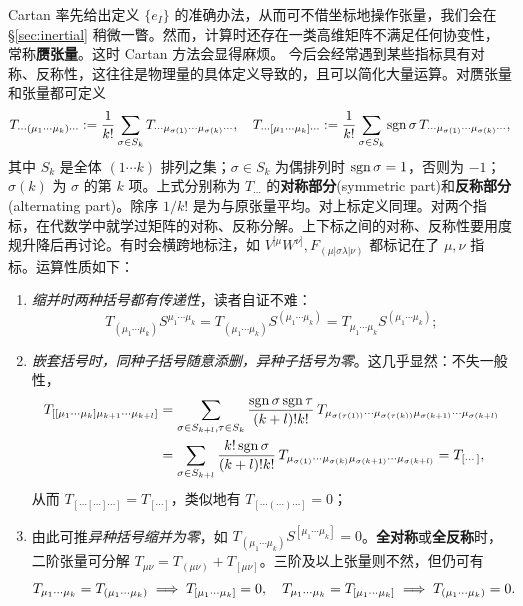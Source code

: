 Cartan 率先给出定义 $\{e_I\}$ 的准确办法，从而可不借坐标地操作张量，我们会在 \S\ref{sec:inertial} 稍微一瞥。然而，计算时还存在一类高维矩阵不满足任何协变性，常称\textbf{赝张量}。这时 Cartan 方法会显得麻烦。
今后会经常遇到某些指标具有对称、反称性，这往往是物理量的具体定义导致的，且可以简化大量运算。对赝张量和张量都可定义
\[
    T_{\cdots(\mu_1\cdots\mu_k)\cdots}:=\frac{1}{k!}\sum_{\sigma\in S_k} T_{\cdots\mu_{\sigma(1)}\cdots\mu_{\sigma(k)}\cdots},\quad
    T_{\cdots[\mu_1\cdots\mu_k]\cdots}:=\frac{1}{k!}\sum_{\sigma\in S_k} \operatorname{sgn}\sigma\,T_{\cdots\mu_{\sigma(1)}\cdots\mu_{\sigma(k)}\cdots},
\]
其中 $S_k$ 是全体 $(1\cdots k)$ 排列之集；$\sigma\in S_k$ 为偶排列时 $\operatorname{sgn}\sigma=1$，否则为 $-1$；$\sigma(k)$ 为 $\sigma$ 的第 $k$ 项。上式分别称为 $T_{\cdots}$ 的\textbf{对称部分}(symmetric part)和\textbf{反称部分}(alternating part)。除序 $1/k!$ 是为与原张量平均。对上标定义同理。对两个指标，在代数学中就学过矩阵的对称、反称分解。上下标之间的对称、反称性要用度规升降后再讨论。有时会横跨地标注，如 $V^{[\mu}W^{\nu]},F_{(\mu|\sigma\lambda|\nu)}$ 都标记在了 $\mu,\nu$ 指标。运算性质如下：
\begin{enumerate}
    \item \textit{缩并时两种括号都有传递性}，读者自证不难：
    \[T_{(\mu_1\cdots\mu_k)}S^{\mu_1\cdots\mu_k}=T_{(\mu_1\cdots\mu_k)}S^{(\mu_1\cdots\mu_k)}=T_{\mu_1\cdots\mu_k}S^{(\mu_1\cdots\mu_k)};\]
    \item \textit{嵌套括号时，同种子括号随意添删，异种子括号为零}。这几乎显然：不失一般性，
    \begin{align*}
        T_{[[\mu_1\cdots\mu_k]\mu_{k+1}\cdots\mu_{k+l}]}&=\sum_{\sigma\in S_{k+l},\tau\in S_k}\frac{\operatorname{sgn}\sigma\operatorname{sgn}\tau}{(k+l)!k!}\,T_{\mu_{\sigma(\tau(1))}\cdots\mu_{\sigma(\tau(k))}\mu_{\sigma(k+1)}\cdots\mu_{\sigma(k+l)}}\\
        &=\sum_{\sigma\in S_{k+l}}\frac{k!\operatorname{sgn}\sigma}{(k+l)!k!}\,T_{\mu_{\sigma(1)}\cdots\mu_{\sigma(k)}\mu_{\sigma(k+1)}\cdots\mu_{\sigma(k+l)}}=T_{[\cdots]},
    \end{align*}
    从而 $T_{[\cdots[\cdots]\cdots]}=T_{[\cdots]}$，类似地有 $T_{[\cdots(\cdots)\cdots]}=0$；
    \item 由此可推\textit{异种括号缩并为零}，如 $T_{(\mu_1\cdots\mu_k)}S^{[\mu_1\cdots\mu_k]}=0$。\textbf{全对称}或\textbf{全反称}时，二阶张量可分解 $T_{\mu\nu}=T_{(\mu\nu)}+T_{[\mu\nu]}$。三阶及以上张量则不然，但仍可有
    \[T_{\mu_1\cdots\mu_k}=T_{(\mu_1\cdots\mu_k)}\implies T_{[\mu_1\cdots\mu_k]}=0,\quad
        T_{\mu_1\cdots\mu_k}=T_{[\mu_1\cdots\mu_k]}\implies T_{(\mu_1\cdots\mu_k)}=0.\]
\end{enumerate}

